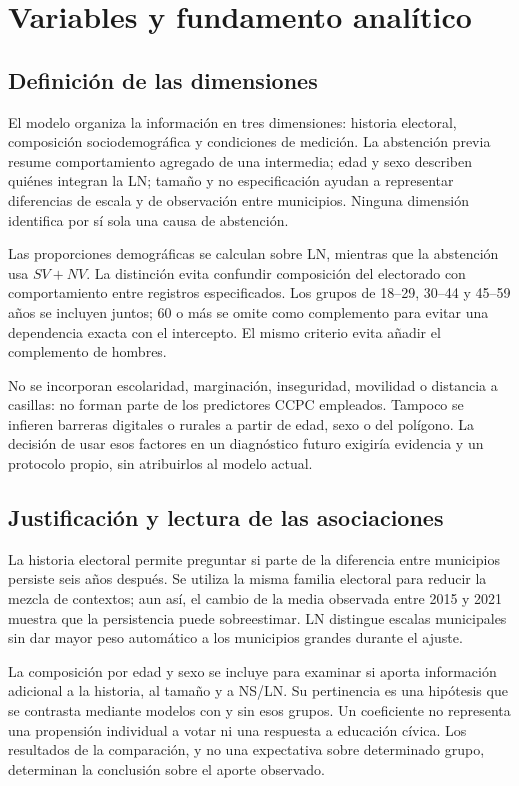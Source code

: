 \documentclass[12pt,a4paper]{article}
\newcommand{\primerparrafo}{\par\noindent\hspace*{1.1em}}
\newcommand{\iniciartabla}{\rowcolors{2}{NCSurfaceMuted}{white}}
\newcommand{\terminartabla}{\rowcolors{1}{}{}}
\newcommand{\pagina}[1]{\clearpage\section{#1}}
\begin{document}
\pagina{Variables y fundamento analítico}
\subsection{Definición de las dimensiones}
\primerparrafo
El modelo organiza la información en tres dimensiones: historia electoral, composición sociodemográfica y condiciones de medición. La abstención previa resume comportamiento agregado de una intermedia; edad y sexo describen quiénes integran la LN; tamaño y no especificación ayudan a representar diferencias de escala y de observación entre municipios. Ninguna dimensión identifica por sí sola una causa de abstención.

\iniciartabla

\terminartabla

Las proporciones demográficas se calculan sobre LN, mientras que la abstención usa $SV+NV$. La distinción evita confundir composición del electorado con comportamiento entre registros especificados. Los grupos de 18--29, 30--44 y 45--59 años se incluyen juntos; 60 o más se omite como complemento para evitar una dependencia exacta con el intercepto. El mismo criterio evita añadir el complemento de hombres.

No se incorporan escolaridad, marginación, inseguridad, movilidad o distancia a casillas: no forman parte de los predictores CCPC empleados. Tampoco se infieren barreras digitales o rurales a partir de edad, sexo o del polígono. La decisión de usar esos factores en un diagnóstico futuro exigiría evidencia y un protocolo propio, sin atribuirlos al modelo actual.

\clearpage
\subsection{Justificación y lectura de las asociaciones}
\primerparrafo
La historia electoral permite preguntar si parte de la diferencia entre municipios persiste seis años después. Se utiliza la misma familia electoral para reducir la mezcla de contextos; aun así, el cambio de la media observada entre 2015 y 2021 muestra que la persistencia puede sobreestimar. LN distingue escalas municipales sin dar mayor peso automático a los municipios grandes durante el ajuste.

La composición por edad y sexo se incluye para examinar si aporta información adicional a la historia, al tamaño y a NS/LN. Su pertinencia es una hipótesis que se contrasta mediante modelos con y sin esos grupos. Un coeficiente no representa una propensión individual a votar ni una respuesta a educación cívica. Los resultados de la comparación, y no una expectativa sobre determinado grupo, determinan la conclusión sobre el aporte observado.
\end{document}
